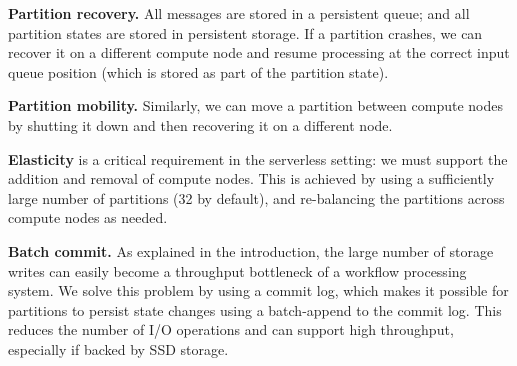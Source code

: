 \begin{description}

\item{\textbf{Partition recovery.}}  All messages are stored in a persistent queue; and all partition states are stored in persistent storage. If a partition crashes, we can recover it on a different compute node and resume processing at the correct input queue position (which is stored as part of the partition state).

\item{\textbf{Partition mobility.}}  Similarly, we can move a partition between compute nodes by shutting it down and then recovering it on a different node. 

\item{\textbf{Elasticity}} is a critical requirement in the serverless setting: we must support the addition and removal of compute nodes. This is achieved by using a sufficiently large number of partitions (32 by default), and re-balancing the partitions across compute nodes as needed. 

\item{\textbf{Batch commit.}} As explained in the introduction, the large number of storage writes can easily become a throughput bottleneck of a workflow processing system. We solve this problem by using a commit log, which makes it possible for partitions to persist state changes using a batch-append to the commit log. This reduces the number of I/O operations and can support high throughput, especially if backed by SSD storage.


\end{description}



